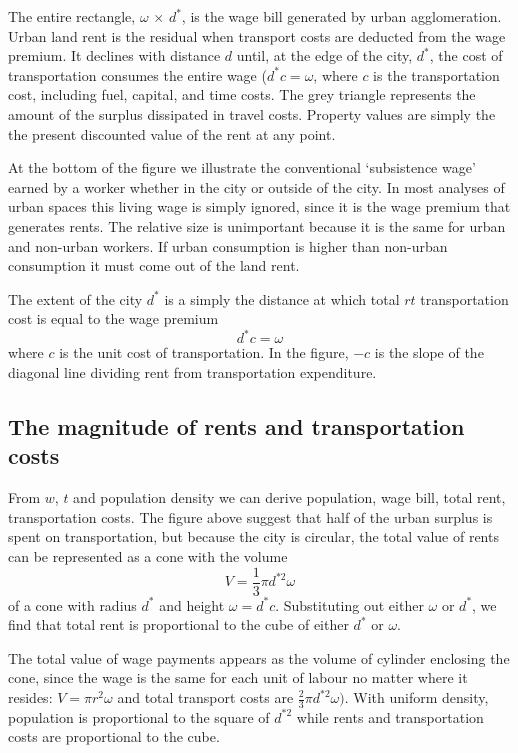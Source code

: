 The entire rectangle, $\omega$ $\times$ $d^*$, is the wage bill generated by urban agglomeration. Urban land rent is the residual when transport costs are deducted from the wage premium. It declines with distance $d$ until, at the edge of the city, $d^*$, the cost of transportation consumes the entire wage ($d^*{c}=\omega$, where ${c}$ is the transportation cost, including fuel, capital, and time costs. The grey triangle represents the amount of the surplus dissipated in travel costs.  Property values are simply the the present discounted value of the rent at any point.

At the bottom of the figure we illustrate the conventional `subsistence wage'  earned by a worker whether in the city or outside of the city. In most analyses of urban spaces this living wage is simply ignored, since it is the wage premium that generates rents.  The relative size is unimportant because it is the same for urban and non-urban workers. If urban consumption is higher than non-urban consumption it must come out of the land rent.

The extent  of the city  $d^*$ is a simply the distance at which total $rt$ transportation cost  is equal to the wage premium
\[d^*{c}= \omega\]
where ${c}$ is the unit cost of transportation. In the figure, $-{c}$ is the slope of the diagonal line dividing rent from transportation expenditure.

 \subsection{The magnitude of rents and transportation costs}
 From $w$, $t$ and population density we can derive population, wage bill, total rent, transportation costs. The figure above suggest that  half of the urban surplus is spent on transportation, but because the city is circular, the total value of rents can be represented as  a cone with the volume  \[ V=\frac{1}{3}\pi  d^{*2} \omega \]
of a cone with radius $d^*$ and  height $\omega = d^*{c}$. Substituting out either  $\omega$ or  $d^*$, we find that total rent is  proportional to the cube of either  $d^*$ or $\omega$. 

The total value of wage payments appears as the volume of cylinder enclosing the cone, since the wage is the same for each unit of labour no matter where it resides: 
$V=\pi r^2 \omega$ 
and total transport costs are 
$\frac{2}{3}\pi  d^{*2} \omega).$
With uniform density, population is proportional to the square of  $d^{*2}$ while rents and transportation costs are proportional to the cube. %

